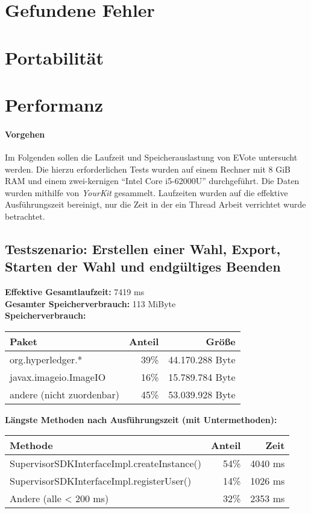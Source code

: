 \documentclass[parskip=full]{scrartcl}
\begin{document}
\section{Gefundene Fehler}

\section{Portabilität}
\newpage
\section{Performanz}
\paragraph{Vorgehen}
Im Folgenden sollen die Laufzeit und Speicherauslastung von EVote untersucht werden.
Die hierzu erforderlichen Tests wurden auf einem Rechner mit 8 GiB RAM und einem zwei-kernigen \enquote{Intel Core i5-62000U} durchgeführt. Die Daten wurden mithilfe von \textit{YourKit} gesammelt. Laufzeiten wurden auf die effektive Ausführungszeit bereinigt, nur die Zeit in der ein Thread Arbeit verrichtet wurde betrachtet.
\subsection{Testszenario: Erstellen einer Wahl, Export, Starten der Wahl und endgültiges Beenden}
\textbf{Effektive Gesamtlaufzeit:} 7419 ms\\
\textbf{Gesamter Speicherverbrauch:} 113 MiByte \\
\textbf{Speicherverbrauch:}

\begin{table}[h!]
	\begin{tabular}[t]{l r r}
		Paket & Anteil & Größe \\ \hline
		org.hyperledger.* & 39\% & 44.170.288 Byte \\
		javax.imageio.ImageIO & 16\% & 15.789.784 Byte \\
		andere (nicht zuordenbar) & 45\% & 53.039.928 Byte \\
	\end{tabular}
\end{table}
\textbf{Längste Methoden nach Ausführungszeit (mit Untermethoden):}

\begin{table}[h!]
	\begin{tabular}[t]{lrr}
		Methode & Anteil & Zeit \\ \hline
		SupervisorSDKInterfaceImpl.createInstance() & 54\% & 4040 ms \\
		SupervisorSDKInterfaceImpl.registerUser() & 14\% & 1026 ms \\
		Andere (alle < 200 ms) & 32\% & 2353 ms
	\end{tabular}
\end{table}
\end{document}
